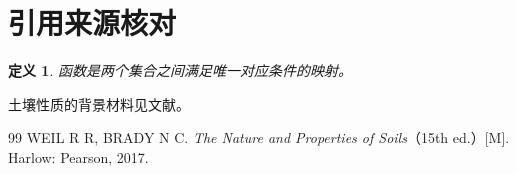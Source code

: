 \documentclass{ctexart}
\newtheorem{definition}{定义}
\begin{document}
\section{引用来源核对}
\begin{definition}函数是两个集合之间满足唯一对应条件的映射。\end{definition}
土壤性质的背景材料见文献\cite{BradyWeil}。

\begin{thebibliography}{99}
 WEIL R R, BRADY N C. \emph{The Nature and Properties of Soils}（15th ed.）[M]. Harlow: Pearson, 2017.

\end{thebibliography}
\end{document}

